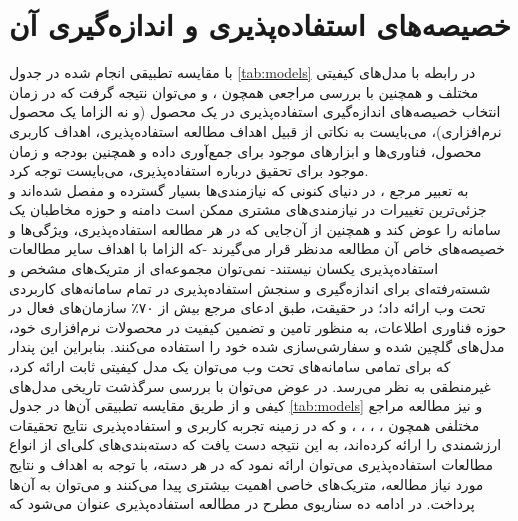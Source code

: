 \section{خصیصه‌های استفاده‌پذیری و اندازه‌گیری آن}
با مقایسه تطبیقی انجام شده در جدول
\ref{tab:models}
در رابطه با مدل‌های کیفیتی مختلف و همچنین با بررسی مراجعی همچون
\cite{wagner_software_2012}،
\cite{wagner_software_2013} و
\cite{albert_measuring_2013}
می‌توان نتیجه گرفت که در زمان انتخاب خصیصه‌های اندازه‌گیری استفاده‌پذیری در یک محصول (و نه الزاما یک محصول نرم‌افزاری)، می‌بایست به نکاتی از قبیل اهداف مطالعه استفاده‌پذیری، اهداف کاربری محصول، فناوری‌ها و ابزارهای موجود برای جمع‌آوری داده و همچنین بودجه و زمان موجود برای تحقیق درباره استفاده‌پذیری، می‌بایست توجه کرد.\\
به تعبیر مرجع
\cite{albert_measuring_2013}،
در دنیای کنونی که نیازمندی‌ها بسیار گسترده و مفصل شده‌اند و جزئی‌ترین تغییرات در نیازمندی‌های مشتری ممکن است دامنه و حوزه مخاطبان یک سامانه را عوض کند و همچنین از آن‌جایی که در هر مطالعه استفاده‌پذیری، ویژگی‌ها و خصیصه‌های خاص آن مطالعه مدنظر قرار می‌گیرند -که الزاما با اهداف سایر مطالعات استفاده‌پذیری یکسان نیستند- نمی‌توان مجموعه‌ای از متریک‌های مشخص و شسته‌رفته‌ای برای اندازه‌گیری و سنجش استفاده‌پذیری در تمام سامانه‌های کاربردی تحت وب ارائه داد؛‌ در حقیقت، طبق ادعای مرجع
\cite{wagner_software_2012}
بیش از ۷۰٪ سازمان‌های فعال در حوزه فناوری اطلاعات، به منظور تامین و تضمین کیفیت در محصولات نرم‌افزاری خود، مدل‌های گلچین شده و سفارشی‌سازی شده خود را استفاده می‌کنند. بنابراین این پندار که برای تمامی سامانه‌های تحت وب می‌توان یک مدل کیفیتی ثابت ارائه کرد، غیرمنطقی به نظر می‌رسد. در عوض می‌توان با بررسی سرگذشت تاریخی مدل‌های کیفی و از طریق مقایسه تطبیقی آن‌ها در جدول
\ref{tab:models}
و نیز مطالعه مراجع مختلفی همچون
\cite{alonso-rios_usability:_2009}،
\cite{bass_linking_2003}،
\cite{bevan_what_1991}،
\cite{pressman_software_2015}،
\cite{sommerville_software_2016}
و
\cite{albert_measuring_2013}
که در زمینه تجربه کاربری و استفاده‌پذیری نتایج تحقیقات ارزشمندی را ارائه کرده‌اند، به این نتیجه دست یافت که دسته‌بندی‌های کلی‌ای از انواع مطالعات استفاده‌پذیری می‌توان ارائه نمود که در هر دسته، با توجه به اهداف و نتایج مورد نیاز مطالعه، متریک‌های خاصی اهمیت بیشتری پیدا می‌کنند و می‌توان به آن‌ها پرداخت. در ادامه ده سناریوی مطرح در مطالعه استفاده‌پذیری عنوان می‌شود که 

